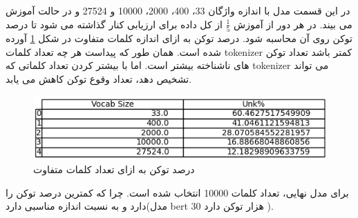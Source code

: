 \section{}
در این قسمت مدل
با اندازه واژگان
33،
 400،
  2000،
   10000 
و
 27524
و در حالت 
آموزش می بیند. در هر دور از آموزش $\frac{1}{5}$ از کل داده برای ارزیابی کنار گذاشته می شود تا درصد توکن
روی آن محاسبه شود. درصد توکن 
به ازای اندازه کلمات متفاوت در شکل
\ref{fig21}
آورده شده است. همان طور که پیداست هر چه تعداد کلمات
tokenizer
کمتر باشد تعداد توکن های ناشناخته بیشتر است. اما با بیشتر کردن تعداد کلماتی که 
tokenizer
می تواند تشخیص دهد، تعداد وقوع توکن
کاهش می یابد.


 \begin{figure}[H]
	\centering
	
	\includegraphics[width=1\textwidth,height=1\textheight,keepaspectratio]{../reports/tokenization/unk_percent}
	\caption{درصد توکن 
		به ازای تعداد کلمات متفاوت}
	\label{fig21}
	
\end{figure}

برای مدل نهایی، تعداد کلمات 10000 انتخاب شده است. چرا که کمترین درصد توکن
را دارد و به نسبت اندازه مناسبی دارد(مدل bert 
30 هزار توکن دارد \cite{Ref4}).